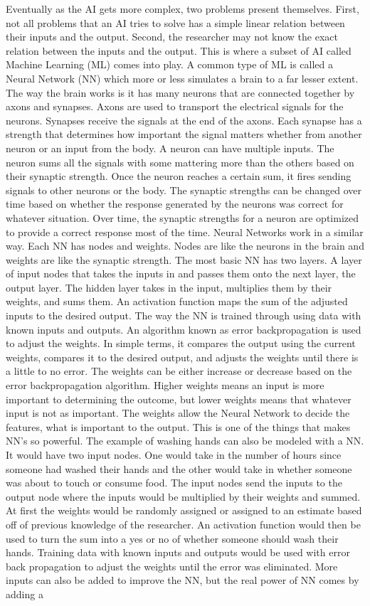 \documentclass[]{article}
\begin{document}
		Eventually as the AI gets more complex, two problems present themselves.  First, not all problems that an AI tries to solve has a simple linear relation between their inputs and the output.  Second, the researcher may not know the exact relation between the inputs and the output.  This is where a subset of AI called Machine Learning (ML) comes into play.  A common type of  ML is called a Neural Network (NN) which more or less simulates a brain to a far lesser extent.  The way the brain works is it has many neurons that are connected together by axons and synapses. Axons are used to transport the electrical signals for the neurons. Synapses receive the signals at the end of the axons. Each synapse has a strength that determines how important the signal matters whether from another neuron or an input from the body. A neuron can have multiple inputs. The neuron sums all the signals with some mattering more than the others based on their synaptic strength. Once the neuron reaches a certain sum, it fires sending signals to other neurons or the body. The synaptic strengths can be changed over time based on whether the response generated by the neurons was correct for whatever situation. Over time, the synaptic strengths for a neuron are optimized to provide a correct response most of the time. Neural Networks work in a similar way. Each NN has nodes and weights. Nodes are like the neurons in the brain and weights are like the synaptic strength. The most basic NN has two layers. A layer of input nodes that takes the inputs in and passes them onto the next layer, the output layer. The hidden layer takes in the input, multiplies them by their weights, and sums them. An activation function maps the sum of the adjusted inputs to the desired output. The way the NN is trained through using data with known inputs and outputs. An algorithm known as error backpropagation is used to adjust the weights. In simple terms, it compares the output using the current weights, compares it to the desired output, and adjusts the weights until there is a little to no error.\cite{bishop2006pattern} The weights can be either increase or decrease based on the error backpropagation algorithm. Higher weights means an input is more important to determining the outcome, but lower weights means that whatever input is not as important. The weights allow the Neural Network to decide the features, what is important to the output. This is one of the things that makes NN’s so powerful. The example of washing hands can also be modeled with a NN. It would have two input nodes. One would take in the number of hours since someone had washed their hands and the other would take in whether someone was about to touch or consume food. The input nodes send the inputs to the output node where the inputs would be multiplied by their weights and summed. At first the weights would be randomly assigned or assigned to an estimate based off of previous knowledge of the researcher. An activation function would then be used to turn the sum into a yes or no of whether someone should wash their hands. Training data with known inputs and outputs would be used with error back propagation to adjust the weights until the error was eliminated. More inputs can also be added to improve the NN, but the real power of NN comes by adding a 
\end{document}
